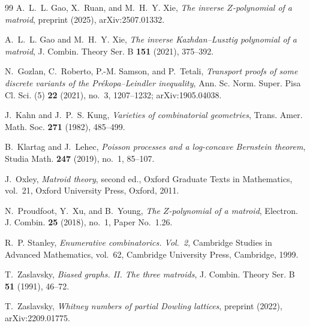 \documentclass[11pt]{amsart}
\theoremstyle{definition}
\theoremstyle{remark}
\numberwithin{equation}{section}
\begin{document}
\begin{thebibliography}{99}
A.~L.~L. Gao, X.~Ruan, and M.~H.~Y. Xie, \emph{The inverse $Z$-polynomial of a matroid}, preprint (2025), arXiv:2507.01332.

A.~L.~L. Gao and M.~H.~Y. Xie, \emph{The inverse Kazhdan--Lusztig polynomial of a matroid}, J. Combin. Theory Ser. B \textbf{151} (2021), 375--392.

N.~Gozlan, C.~Roberto, P.-M. Samson, and P.~Tetali, \emph{Transport proofs of some discrete variants of the Pr\'ekopa--Leindler inequality}, Ann. Sc. Norm. Super. Pisa Cl. Sci. (5) \textbf{22} (2021), no.~3, 1207--1232; arXiv:1905.04038.

J.~Kahn and J.~P.~S. Kung, \emph{Varieties of combinatorial geometries}, Trans. Amer. Math. Soc. \textbf{271} (1982), 485--499.

B.~Klartag and J.~Lehec, \emph{Poisson processes and a log-concave Bernstein theorem}, Studia Math. \textbf{247} (2019), no.~1, 85--107.

J.~Oxley, \emph{Matroid theory}, second ed., Oxford Graduate Texts in Mathematics, vol.~21, Oxford University Press, Oxford, 2011.

N.~Proudfoot, Y.~Xu, and B.~Young, \emph{The $Z$-polynomial of a matroid}, Electron. J. Combin. \textbf{25} (2018), no.~1, Paper No.~1.26.

R.~P. Stanley, \emph{Enumerative combinatorics. Vol.~2}, Cambridge Studies in Advanced Mathematics, vol.~62, Cambridge University Press, Cambridge, 1999.

T.~Zaslavsky, \emph{Biased graphs. II. The three matroids}, J. Combin. Theory Ser. B \textbf{51} (1991), 46--72.

T.~Zaslavsky, \emph{Whitney numbers of partial Dowling lattices}, preprint (2022), arXiv:2209.01775.

\end{thebibliography}
\end{document}
